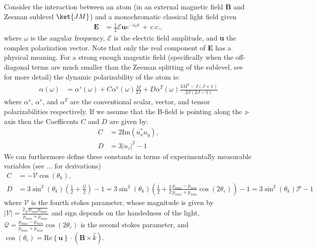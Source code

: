 	Consider the interaction between an atom (in an external magnetic field \textbf{B} and Zeeman sublevel \(\ket{JM}\)) and a monochromatic classical light field given 
	\begin{align}
	    \textbf{E} &= \frac{1}{2} \mathcal{E} \textbf{u} e^{-i \omega t} \, + \, \text{c.c.},
	\end{align}
	where \(\omega\) is the angular frequency, \(\mathcal{E}\) is the electric field amplitude, and \textbf{u} the complex polarization vector. Note that only the real component of \textbf{E} has a physical meaning. For a strong enough magentic field (specifically when the off-diagonal terms are much smaller than the   Zeeman splitting of the sublevel, see \cite{} for more detail) the dynamic polarizability of the atom is:
	\begin{align}
	    \alpha(\omega) &= \alpha^s(\omega) + C \alpha^v(\omega) \frac{M}{2J} + D \alpha^T(\omega) \frac{3M^2-J(J+1)}{2J(2J-1)}
	\end{align}
	where \(\alpha^s\), \(\alpha^v\), and \(\alpha^T\) are the conventional scalar, vector, and tensor polarizabilities respectively. If we assume that the B-field is pointing along the \textit{z}-axis then the Coefficents \(C\) and \(D\) are given by:
	\begin{align}
	    C &= 2 \text{Im}(u_x^* u_y),\\
	    D &= 3|u_z|^2 -1
	\end{align}
	We can furthermore define these constants in terms of experimentally measurable variables (see ... for derivations)
	\begin{align}
	     C &= - \mathcal{V} \cos \left( \theta_k \right), \label{eqn:C} \\
	     D &= 3 \sin^2\left( \theta_k \right) \left(\frac{1}{2} +  \frac{\mathcal{Q}}{2}\right) -1 = 3 \sin^2\left( \theta_k \right) \left( \frac{1}{2} + \frac{1}{2} \frac{p_{max}-p_{min}}{p_{max}+p_{min}} \cos(2\theta_\varepsilon)\right) - 1 = 3 \sin^2(\theta_k) \mathcal{P}-1 \label{eqn:D}
	\end{align}
	where \(\mathcal{V}\) is the fourth stokes parameter, whose magnitude is given by \(|\mathcal{V}| = \frac{2\sqrt{p_{min}p_{max}}}{p_{min}+p_{max}}\) and sign depends on the handedness of the light, \(\mathcal{Q}=\frac{p_{max}-p_{min}}{p_{max}+p_{min}} \cos(2\theta_\varepsilon)\) is the second stokes parameter, and $\cos(\theta_\epsilon)=\text{Re}\left\{\textbf{u}\right\}\cdot(\textbf{B}\times \hat{k})$.

